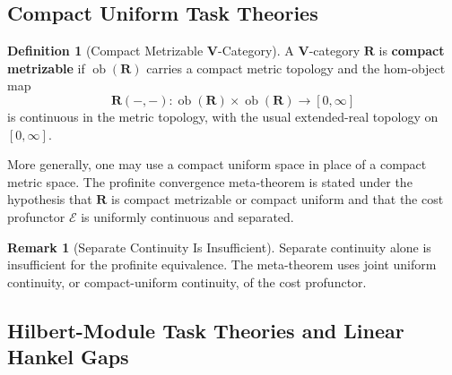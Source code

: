 \documentclass[12pt]{article}
\theoremstyle{definition}
\newtheorem{definition}[theorem]{Definition}
\newtheorem{remark}[theorem]{Remark}
\begin{document}
\subsection{Compact Uniform Task Theories}
\label{subsec:compact-uniform}

\begin{definition}[Compact Metrizable $\mathbf V$-Category]
\label{def:compact-metrizable}
A $\mathbf V$-category $\mathbf R$ is \textbf{compact metrizable} if
$\operatorname{ob}(\mathbf R)$ carries a compact metric topology and the
hom-object map
\[
\mathbf R(-,-):
\operatorname{ob}(\mathbf R)\times\operatorname{ob}(\mathbf R)
\to
[0,\infty]
\]
is continuous in the metric topology, with the usual extended-real topology on
$[0,\infty]$.
\end{definition}

More generally, one may use a compact uniform space in place of a compact
metric space.  The profinite convergence meta-theorem is stated under the
hypothesis that $\mathbf R$ is compact metrizable or compact uniform and that
the cost profunctor $\mathcal E$ is uniformly continuous and separated.

\begin{remark}[Separate Continuity Is Insufficient]
\label{rem:separate-continuity-insufficient}
Separate continuity alone is insufficient for the profinite equivalence.  The
meta-theorem uses joint uniform continuity, or compact-uniform continuity, of
the cost profunctor.
\end{remark}

\subsection{Hilbert-Module Task Theories and Linear Hankel Gaps}
\label{subsec:hilbert-module}
\end{document}

